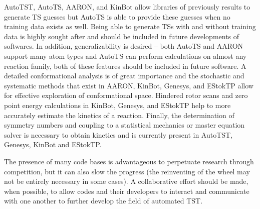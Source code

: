 \documentclass[preprint, 11pt]{elsarticle} %
\begin{document}
AutoTST, AutoTS, AARON, and KinBot allow libraries of previously results to generate TS guesses but AutoTS is able to provide these guesses when no training data exists as well.
Being able to generate TSs with and without training data is highly sought after and should be included in future developments of softwares.
In addition, generalizability is desired -- both AutoTS and AARON support many atom types and AutoTS can perform calculations on almost any reaction family, both of these features should be included in future software.
A detailed conformational analysis is of great importance and the stochastic and systematic methods that exist in AARON, KinBot, Genesys, and EStokTP allow for effective exploration of conformational space.
Hindered rotor scans and zero point energy calculations in KinBot, Genesys, and EStokTP help to more accurately estimate the kinetics of a reaction.
Finally, the determination of symmetry numbers and coupling to a statistical mechanics or master equation solver is necessary to obtain kinetics and is currently present in AutoTST, Genesys, KinBot and EStokTP.

The presence of many code bases is advantageous to perpetuate research through competition, but it can also slow the progress (the reinventing of the wheel may not be entirely necessary in some cases).
A collaborative effort should be made, when possible, to allow codes and their developers to interact and communicate with one another to further develop the field of automated TST.
\end{document}
